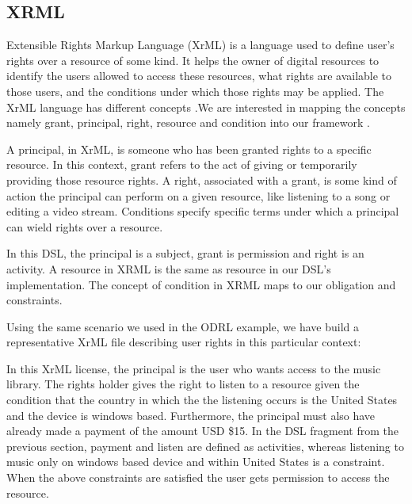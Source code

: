\subsection{XRML}\label{sec:model-xrml}
Extensible Rights Markup Language (XrML) is a language used to define user's rights over a resource of some kind. It helps the owner of digital resources to identify the users allowed to access these resources, what rights are available to those users, and the conditions under which those rights may be applied. The XrML language has different concepts .We are interested in mapping the concepts namely grant, principal, right, resource and condition into our framework \cite{XrML-spec}.

A principal, in XrML, is someone who has been granted rights to a specific resource.  In this context, grant refers to the act of giving or temporarily providing those resource rights.  A right, associated with a grant, is some kind of action the principal can perform on a given resource, like listening to a song or editing a video stream.  Conditions specify specific terms under which a principal can wield rights over a resource.

In this DSL, the principal is a subject, grant is permission and right is an activity. A resource in XRML is the same as resource in our DSL's implementation. The concept of condition in XRML maps to our obligation and constraints.

Using the same scenario we used in the ODRL example, we have build a representative XrML file describing user rights in this particular context:



In this XrML license, the principal is the user who wants access to the music library. The rights holder gives the right to listen to a resource given the condition that the country in which the the listening occurs is the United States and the device is windows based. Furthermore, the principal must also have already made a payment of the amount USD \$15.  In the DSL fragment from the previous section, payment and listen are defined as activities, whereas listening to music only on windows based device and within United States is a constraint. When the above constraints are satisfied the user gets permission to access the resource.
